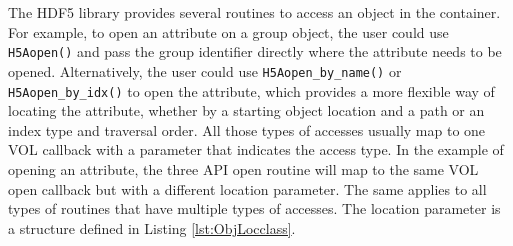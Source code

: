 The HDF5 library provides several routines to access an object in the
container. For example, to open an attribute on a group object, the
user could use \texttt{H5Aopen()} and pass the group identifier directly
where the attribute needs to be opened. Alternatively, the user could
use \texttt{H5Aopen\_by\_name()} or \texttt{H5Aopen\_by\_idx()} to open the
attribute, which provides a more flexible way of locating the
attribute, whether by a starting object location and a path or an
index type and traversal order. All those types of accesses usually
map to one VOL callback with a parameter that indicates the access
type. In the example of opening an attribute, the three API open
routine will map to the same VOL open callback but with a different
location parameter. The same applies to all types of routines that
have multiple types of accesses.  The location parameter is a
structure defined in Listing \ref{lst:ObjLocclass}.

\newpage

